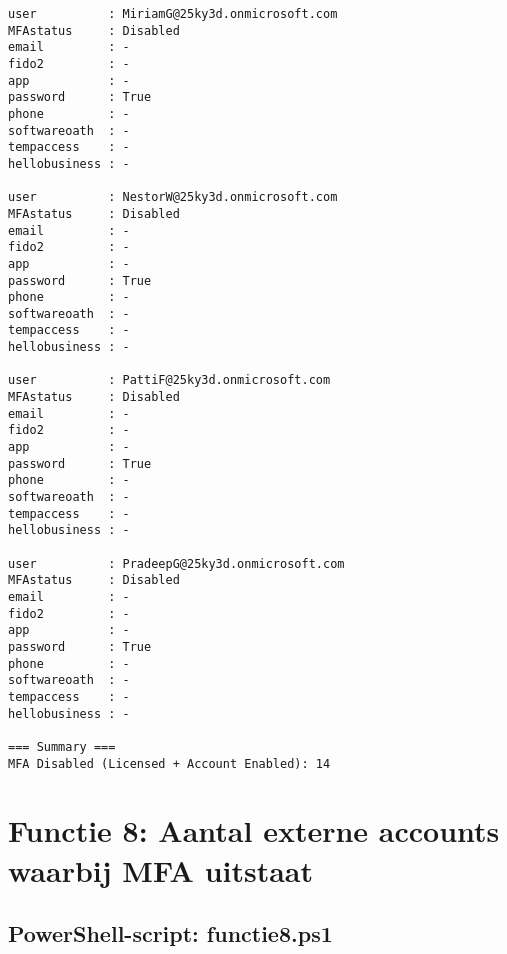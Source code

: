 \begin{tiny}
\begin{verbatim}
user          : MiriamG@25ky3d.onmicrosoft.com
MFAstatus     : Disabled
email         : -
fido2         : -
app           : -
password      : True
phone         : -
softwareoath  : -
tempaccess    : -
hellobusiness : -

user          : NestorW@25ky3d.onmicrosoft.com
MFAstatus     : Disabled
email         : -
fido2         : -
app           : -
password      : True
phone         : -
softwareoath  : -
tempaccess    : -
hellobusiness : -

user          : PattiF@25ky3d.onmicrosoft.com
MFAstatus     : Disabled
email         : -
fido2         : -
app           : -
password      : True
phone         : -
softwareoath  : -
tempaccess    : -
hellobusiness : -

user          : PradeepG@25ky3d.onmicrosoft.com
MFAstatus     : Disabled
email         : -
fido2         : -
app           : -
password      : True
phone         : -
softwareoath  : -
tempaccess    : -
hellobusiness : -

=== Summary ===
MFA Disabled (Licensed + Account Enabled): 14
    \end{verbatim}
\end{tiny}

\clearpage

\section{Functie 8: Aantal externe accounts waarbij MFA uitstaat}

\subsection{PowerShell-script: functie8.ps1}

